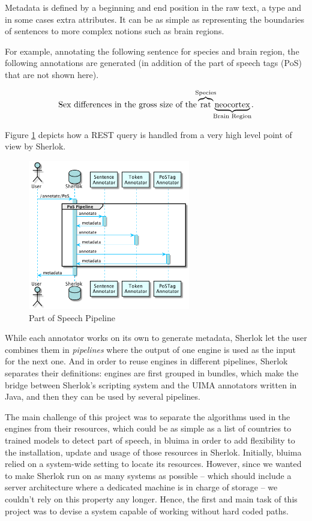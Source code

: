 \documentclass{article}
\begin{document}
Metadata is defined by a beginning and end position in the raw text, a type and in some cases extra
attributes. It can be as simple as representing the boundaries of sentences to more complex notions
such as brain regions.

For example, annotating the following sentence for species and brain region, the following
annotations are generated (in addition of the part of speech tags (PoS) that are not shown here).

\[
    \text{Sex differences in the gross size of the}
    \overbrace{\text{rat}}^{\mathclap{\text{Species}}}
    \underbrace{\text{neocortex}}_{\mathclap{\text{Brain Region}}} \text{.}
\]

Figure \ref{fig:sherlok_basic_rest_call} depicts how a REST query is handled from a very high level
point of view by Sherlok.

\begin{figure}
    \centering
    \includegraphics[width=200pt]{res/sherlok_basic_rest_call.png}
    \caption{Part of Speech Pipeline}
    \label{fig:sherlok_basic_rest_call}
\end{figure}

While each annotator works on its own to generate metadata, Sherlok let the user combines them in
\emph{pipelines} where the output of one engine is used as the input for the next one. And in order
to reuse engines in different pipelines, Sherlok separates their definitions: engines are first
grouped in bundles, which make the bridge between Sherlok's scripting system and the UIMA annotators
written in Java, and then they can be used by several pipelines.

The main challenge of this project was to separate the algorithms used in the engines from their
resources, which could be as simple as a list of countries to trained models to detect part of
speech, in bluima in order to add flexibility to the installation, update and usage of those
resources in Sherlok.  Initially, bluima relied on a system-wide setting to locate its resources.
However, since we wanted to make Sherlok run on as many systems as possible -- which should include
a server architecture where a dedicated machine is in charge of storage -- we couldn't rely on this
property any longer.  Hence, the first and main task of this project was to devise a system capable
of working without hard coded paths.
\end{document}
